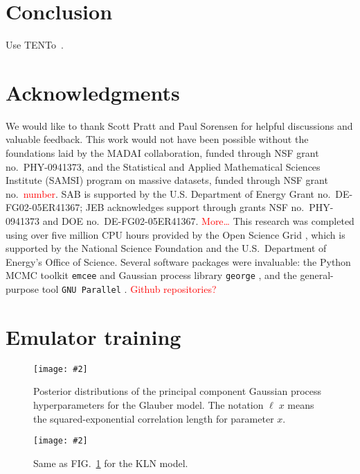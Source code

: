 \documentclass[aps,prc,reprint,amsmath]{revtex4-1}
\newcommand{\todo}[1]{\textcolor{red}{#1}}
\newcommand{\widefig}[3][t]{
  \begin{figure*}[#1]
    \texttt{[image: \#2]}
    \caption{\label{fig:#2}#3}
  \end{figure*}
}
\newcommand{\trento}{T\raisebox{-.5ex}{R}ENTo}
\begin{document}
\section{Conclusion}

Use \trento\ \cite{Moreland:2014oya}.


\section*{Acknowledgments}

We would like to thank Scott Pratt and Paul Sorensen for helpful discussions and valuable feedback.
This work would not have been possible without the foundations laid by the MADAI collaboration, funded through NSF grant no.~PHY-0941373, and the Statistical and Applied Mathematical Sciences Institute (SAMSI) program on massive datasets, funded through NSF grant no.~\todo{number}.
SAB is supported by the U.S. Department of Energy Grant no.~DE-FG02-05ER41367; JEB acknowledges support through grants NSF no.~PHY-0941373 and DOE no.~DE-FG02-05ER41367.
\todo{More\ldots}
This research was completed using over five million CPU hours provided by the Open Science Grid \cite{Pordes:2007zzb,Sfiligoi:2010zz}, which is supported by the National Science Foundation and the U.S.\ Department of Energy's Office of Science.
Several software packages were invaluable:
the Python MCMC toolkit \texttt{emcee} \cite{FM:2013mc} and Gaussian process library \texttt{george} \cite{Ambikasaran:2014gp}, and the general-purpose tool \texttt{GNU Parallel} \cite{Tange:2011pa}.
\todo{Github repositories?}


\appendix

\section{\label{app:train}Emulator training}

\widefig{train_glb}{
  Posterior distributions of the principal component Gaussian process hyperparameters for the Glauber model.
  The notation $\ell\;x$ means the squared-exponential correlation length for parameter $x$.
}

\widefig{train_kln}{
  Same as FIG.~\ref{fig:train_glb} for the KLN model.
}




\end{document}
